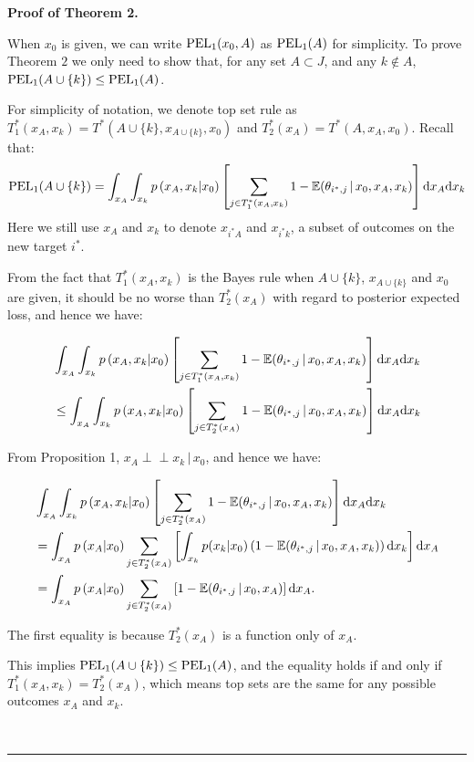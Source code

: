 \documentclass[12pt]{article}
\newenvironment{proof}[1][Proof]{\noindent\textbf{#1.} }{\ \rule{0.5em}{0.5em}}
\newcommand{\indep}{\perp \!\!\! \perp}
\begin{document}
\begin{proof}[Proof of Theorem 2]

When $x_0$ is given, we can write ${\mbox {\rm PEL}}_1(x_0,A)$ as ${\mbox {\rm PEL}}_1(A)$ for simplicity. To prove Theorem $2$ we only need to show that, for any set $A \subset J$, and any $k\notin A$, ${\mbox {\rm PEL}}_1(A\cup\{k\})\leq {\mbox {\rm PEL}}_1(A)$.

For simplicity of notation, we denote top set rule as 
$T_1^*(x_A,x_k) = T^*(A\cup\{k\}, x_{A\cup\{k\}}, x_0)$ and $T_2^*(x_A) = T^*(A, x_{A}, x_0)$. Recall that:
\begin{eqnarray*}
    {\mbox {\rm PEL}}_1(A\cup\{k\})= \int_{x_{A}}\int_{x_k} p\left( x_{A},x_k | x_0 \right) 
\left[ \sum_{j \in  T_1^*(x_A,x_k)}  1 - \mathbb{E} (\theta_{i^*,j} \, |\, x_0,x_A,x_k) \right]{\rm d}x_A {\rm d}x_k
\end{eqnarray*}
Here we still use $x_A$ and $x_k$ to denote $x_{i^*A}$ and $x_{i^*k}$, a subset of outcomes on the new target $i^*$.

From the fact that $T_1^*(x_A,x_k)$ is the Bayes rule when $A\cup\{k\}$, $x_{A\cup\{k\}}$ and $x_0$ are given, it should be no worse than $T_2^*(x_A)$ with regard to posterior expected loss, and hence we have:

\begin{align*}
&\int_{x_{A}}\int_{x_k} p\left( x_{A},x_k | x_0 \right)
\left[ \sum_{j \in  T_1^*(x_A,x_k)}  1 - \mathbb{E} (\theta_{i^*,j} \, |\, x_0,x_A,x_k) \right] {\rm d}x_A {\rm d}x_k\\
&\leq 
\int_{x_{A}}\int_{x_k} p\left( x_{A},x_k | x_0 \right)
\left[ \sum_{j \in  T_2^*(x_A)}  1 - \mathbb{E} (\theta_{i^*,j} \, |\, x_0,x_A,x_k) \right]{\rm d}x_A {\rm d}x_k
\end{align*}

From Proposition 1, $x_A \indep x_k \, | \, x_0$, and hence we have:

\begin{align*}
&\int_{x_{A}}\int_{x_k} p\left( x_{A},x_k | x_0 \right)
\left[ \sum_{j \in  T_2^*(x_A)}  1 - \mathbb{E} (\theta_{i^*,j} \, |\, x_0,x_A,x_k) \right]{\rm d}x_A {\rm d}x_k\\
    &= \int_{x_{A}}p\left(x_A|x_0\right)\sum_{j \in  T_2^*(x_A)}\left[\int_{x_k}p(x_k|x_0)\left(1-\mathbb{E} (\theta_{i^*,j} \, |\, x_0,x_A,x_k)\right){\rm d}x_k\right] {\rm d}x_A\\
&= \int_{x_{A}}p\left(x_A|x_0\right) \sum_{j \in  T_2^*(x_A)}\left[  1 - \mathbb{E} (\theta_{i^*,j} \, |\, x_0,x_A) \right]{\rm d}x_A.
\end{align*}


The first equality is because $T_2^*(x_A)$ is a function only of $x_A$. 

This implies ${\mbox {\rm PEL}}_1(A\cup\{k\})\leq {\mbox {\rm PEL}}_1(A)$, and the equality holds if and only if $T_1^*(x_A,x_k) = T_2^*(x_A)$, which means top sets are the same for any possible outcomes $x_A$ and $x_k$. 

\end{proof}
\end{document}
